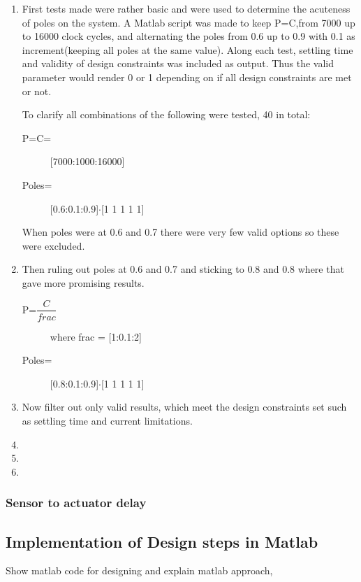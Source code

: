 \begin{enumerate}
	\item First tests made were rather basic and were used to determine the acuteness of poles on the system. A Matlab script was made to keep P=C,from 7000 up to 16000 clock cycles, and alternating the poles from 0.6 up to 0.9 with 0.1 as increment(keeping all poles at the same value). Along each test, settling time and validity of design constraints was included as output. Thus the valid parameter would render 0 or 1 depending on if all design constraints are met or not.
	
	To clarify all combinations of the following were tested, 40 in total:
	\begin{description}
		\item[P=C=] [7000:1000:16000]
		\item[Poles=] [0.6:0.1:0.9]$\cdot$[1 1 1 1 1]
	\end{description}
	When poles were at 0.6 and 0.7 there were very few valid options so these were excluded.
	
	\item Then ruling out poles at 0.6 and 0.7 and sticking to 0.8 and 0.8 where that gave more promising results.
		\begin{description}
			\item[P=$\dfrac{C}{frac}$] where frac = [1:0.1:2]
			\item[Poles=] [0.8:0.1:0.9]$\cdot$[1 1 1 1 1]
		\end{description}
	\item Now filter out only valid results, which meet the design constraints set such as settling time and current limitations.
	\item 
	\item
	\item
\end{enumerate}

\subsubsection{Sensor to actuator delay}
\label{sec:stad}

\subsection{Implementation of Design steps in Matlab}
\color{red}
Show matlab code for designing and explain matlab approach,
\color{black}